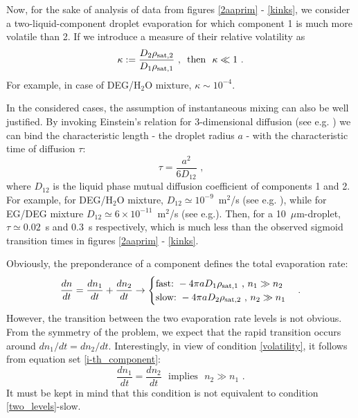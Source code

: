 \documentclass[twoside,twocolumn,9pt]{article}
\begin{document}
Now, for the sake of analysis of data from figures \ref{2aaprim} - \ref{kinks}, we consider a two-liquid-component droplet evaporation for which component 1 is much more volatile than 2. If we introduce a measure of their relative volatility as
\begin{equation}
\kappa := \frac{D_2\rho_{{\rm sat},2}}{D_1\rho_{{\rm sat},1}} \mbox{~, ~then ~$\kappa  \ll 1$~.}
\label{volatility}
\end{equation}
For example, in case of DEG/H$_2$O mixture, $\kappa \sim 10^{-4}$. 

In the considered cases, the assumption of instantaneous mixing can also be well justified. By invoking Einstein's relation \cite{Einstein1907} for 3-dimensional diffusion (see e.g. \cite{Keffer}) we can bind the characteristic length - the droplet radius $a$ - with the characteristic time of diffusion $\tau$:
\begin{equation}
\tau = \frac{a^2}{6D_{12}} \mbox{~,} \label{Einstein_diffusion}
\end{equation}
where $D_{12}$ is the liquid phase mutual diffusion coefficient of components 1 and 2. For example, for DEG/H$_2$O mixture, $D_{12} \simeq 10^{-9}$~m$^2$/s (see e.g. \cite{Wang_glycols_diffusion}), while for EG/DEG mixture $D_{12} \simeq 6 \times 10^{-11}$~m$^2$/s (see e.g.\cite{Mitchel}). Then, for a 10~$\mu$m-droplet, $\tau \simeq 0.02$~s and  0.3~s respectively, which is much less than the observed sigmoid transition times in figures  \ref{2aaprim} - \ref{kinks}.

Obviously, the preponderance of a component defines the total evaporation rate:
\begin{equation}
\frac{dn}{dt}=\frac{dn_1}{dt}+\frac{dn_2}{dt} \rightarrow
\begin{cases}
\mbox{fast:~} -4\pi a D_1\rho_{{\rm sat},1} \mbox{~,~} n_1 \gg n_2 \\
\mbox{slow:~} -4\pi a D_2\rho_{{\rm sat},2} \mbox{~,~} n_2 \gg n_1
\end{cases} \mbox{.}
\label{two_levels}
\end{equation}
However, the transition between the two evaporation rate levels is not obvious. From the symmetry of the problem, we expect that the rapid transition occurs around $dn_1/dt=dn_2/dt$. Interestingly, in view of condition \ref{volatility}, it follows from equation set \ref{i-th_component}:
\begin{equation}
\frac{dn_1}{dt}=\frac{dn_2}{dt} \mbox{~~implies~~} n_2 \gg n_1 \mbox{~.}
\label{equal_rates}
\end{equation}
It must be kept in mind that this condition is not equivalent to condition \ref{two_levels}-slow.
\end{document}
